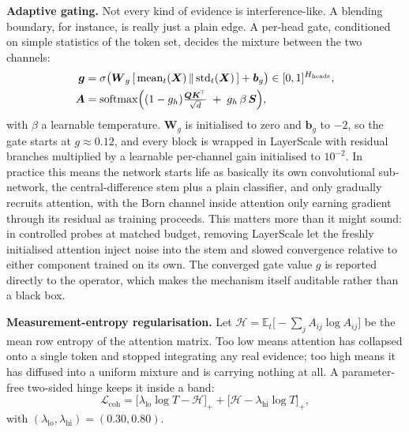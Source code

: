 \documentclass[conference]{IEEEtran}
\newcommand{\bs}[1]{\boldsymbol{#1}}
\begin{document}
\textbf{Adaptive gating.} Not every kind of evidence is interference-like. A
blending boundary, for instance, is really just a plain edge. A per-head gate,
conditioned on simple statistics of the token set, decides the mixture between the
two channels:
\begin{align}
\bs{g} &= \sigma\bigl(\bs{W}_{g}\,[\,\mathrm{mean}_t(\bs{X}) \,\Vert\, \mathrm{std}_t(\bs{X})\,] + \bs{b}_{g}\bigr) \in [0,1]^{H_{\text{heads}}},\\
\bs{A} &= \mathrm{softmax}\Bigl( (1-g_{h})\tfrac{\bs{Q}\bs{K}^{\!\top}}{\sqrt{d}} \;+\; g_{h}\,\beta\, \bs{S} \Bigr),
\label{eq:gate}
\end{align}
with $\beta$ a learnable temperature. $\bs{W}_{g}$ is initialised to zero and
$\bs{b}_{g}$ to $-2$, so the gate starts at $g\approx0.12$, and every block is
wrapped in LayerScale \cite{touvron2021cait} with residual branches multiplied by a
learnable per-channel gain initialised to $10^{-2}$. In practice this means the
network starts life as basically its own convolutional sub-network, the
central-difference stem plus a plain classifier, and only gradually recruits
attention, with the Born channel inside attention only earning gradient through its
residual as training proceeds. This matters more than it might sound: in controlled
probes at matched budget, removing LayerScale let the freshly initialised attention
inject noise into the stem and slowed convergence relative to either component
trained on its own. The converged gate value $g$ is reported directly to the
operator, which makes the mechanism itself auditable rather than a black box.

\textbf{Measurement-entropy regularisation.} Let
$\mathcal{H}=\mathbb{E}_{t}\bigl[-\sum_{j}A_{ij}\log A_{ij}\bigr]$ be the mean row
entropy of the attention matrix. Too low means attention has collapsed onto a single
token and stopped integrating any real evidence; too high means it has diffused into
a uniform mixture and is carrying nothing at all. A parameter-free two-sided hinge
keeps it inside a band:
\begin{equation}
\mathcal{L}_{\text{coh}} = \bigl[\lambda_{\text{lo}}\log T - \mathcal{H}\bigr]_{+}
+ \bigl[\mathcal{H} - \lambda_{\text{hi}}\log T\bigr]_{+},
\end{equation}
with $(\lambda_{\text{lo}},\lambda_{\text{hi}})=(0.30,0.80)$.
\end{document}
